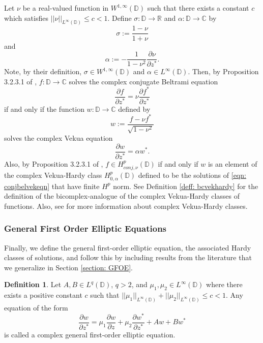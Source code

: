 \documentclass[12pt,reqno]{amsart}
\theoremstyle{definition}
\newtheorem{deff}[theorem]{Definition}
\theoremstyle{remark}
\newcommand{\p}{\partial}
\newcommand{\disk}{\mathbb{D}}
\begin{document}
        Let $\nu$ be a real-valued function in $W^{1,\infty}(\disk)$ such that there exists a constant $c$ which satisfies $||\nu||_{L^\infty(\disk)} \leq c < 1$. Define $\sigma: \disk\to\mathbb{R}$ and $\alpha : \disk \to \mathbb{C}$ by 
        \[
                \sigma := \frac{1-\nu}{1+\nu}
        \]
        and
        \[
                \alpha := -\frac{1}{1-\nu^2} \frac{\p \nu}{\p z^*}.
        \]
        Note, by their definition, $\sigma \in W^{1,\infty}(\disk)$ and $\alpha \in L^\infty(\disk)$. Then, by Proposition 3.2.3.1 of \cite{conjbel}, $f: \disk\to\mathbb{C}$ solves the complex conjugate Beltrami equation
        \[
            \frac{\p f}{\p z^*} = \nu \frac{\p f^*}{\p z^*}
        \]
        if and only if 
        the function $w: \disk\to\mathbb{C}$ defined by 
        \[
            w := \frac{f - \nu f^*}{\sqrt{1-\nu^2}}
        \]
        solves the complex Vekua equation
        \begin{equation}\label{eqn: conjbelvekeqn}
            \frac{\p w}{\p z^*} = \alpha w^*.
        \end{equation}
        Also, by Proposition 3.2.3.1 of \cite{conjbel}, $f \in H^p_{conj,\nu}(\disk)$ if and only if $w$ is an element of the complex Vekua-Hardy class $H^p_{0,\alpha}(\disk)$ defined to be the solutions of \eqref{eqn: conjbelvekeqn} that have finite $H^p$ norm. See Definition \ref{deff: bcvekhardy} for the definition of the bicomplex-analogue of the complex Vekua-Hardy classes of functions. Also, see \cite{KlimBook, WBD, PozHardy, CompOp, moreVekHardy} for more information about complex Vekua-Hardy classes. 
        

        \subsubsection{General First Order Elliptic Equations}

        

        Finally, we define the general first-order elliptic equation, the associated Hardy classes of solutions, and follow this by including results from the literature that we generalize in Section \ref{section: GFOE}.

        \begin{deff}
            Let $A, B \in L^q(\disk)$, $q>2$, and $\mu_1, \mu_2 \in L^\infty(\disk)$ where there exists a positive constant $c$ such that $||\mu_1||_{L^\infty(\disk)} + ||\mu_2||_{L^\infty(\disk)}\leq c < 1$. Any equation of the form 
            \[
                \frac{\p w}{\p z^*} = \mu_1 \frac{\p w}{\p z} + \mu_2 \frac{\p w^*}{\p z^*} + Aw + Bw^*
            \]
            is called a complex general first-order elliptic equation. 
        \end{deff}
\end{document}
